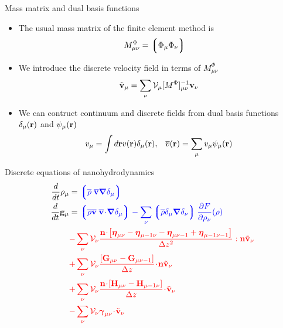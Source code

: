 \documentclass{beamer}
\newcommand{\esc}{\!\cdot\!}
\newcommand{\llg}{\left\lgroup}
\newcommand{\rlg}{\right\rgroup}
\begin{document}
\begin{frame}{Mass matrix and dual basis functions}
  \begin{itemize}
    \item The usual mass matrix of the finite element method is
      \begin{align}
      M^\Phi_{\mu\nu}&=\llg\Phi_\mu\Phi_\nu\rlg  
      \nonumber
      \end{align}
    \item We introduce the discrete velocity field in terms of $M^\Phi_{\mu\nu}$
      \begin{align}
        \tilde{{\bf v}}_{\mu}=\sum_{\nu}{\cal V}_{\mu}[M^{\Phi}]^{-1}_{\mu\nu}{\bf v}_{\nu}
        \nonumber
      \end{align}
  \item We can contruct continuum and discrete fields from dual basis functions $\delta_{\mu}({\bf r})$ and $\psi_\mu({\bf r})$ 
    \begin{align}
      v_\mu=\int d{\bf r}v({\bf r})\delta_\mu({\bf r}),&&
        \overline{v}({\bf r}) =\sum_{\mu}v_\mu\psi_\mu({\bf r})
    \nonumber
    \end{align}
  \end{itemize}
\end{frame}

\begin{frame}{Discrete equations of nanohydrodynamics}
\begin{align}
  \frac{d}{dt}\rho_\mu&=  {\color{blue} \llg\overline{\rho} \; \overline{\bf v}\boldsymbol{\nabla}\delta_\mu \rlg}
\nonumber\\
\frac{d}{dt}{\bf g}_\mu&=
{\color{blue} \llg\overline{\rho} \overline{\bf v}\;\overline{\bf v}\esc\boldsymbol{\nabla}\delta_{\mu}\rlg
-\sum_\nu\llg\overline{\rho}\delta_{\mu}\boldsymbol{\nabla}\delta_{\nu}\rlg
\frac{\partial  F}{\partial \rho_{\nu}}(\rho)}
\nonumber\\
&{\color{red}-\sum_{\nu}{\cal V}_\nu \frac{{\bf n}\esc\left[\boldsymbol{\eta}_{\mu\nu}-\boldsymbol{\eta}_{\mu-1\nu}-\boldsymbol{\eta}_{\mu\nu-1}+\boldsymbol{\eta}_{\mu-1\nu-1}\right]}{\Delta z^2}:{\bf n}\tilde{\bf v}_\nu}
\nonumber\\
&{\color{red}+\sum_{\nu}{\cal V}_\nu\frac{\left[{\bf G}_{\mu\nu}-{\bf G}_{\mu\nu-1}\right]}{\Delta z}\esc{\bf n}\tilde{\bf v}_\nu}
\nonumber\\
&{\color{red}+\sum_{\nu}{\cal V}_\nu\frac{{\bf n}\esc\left[{\bf H}_{\mu\nu}-{\bf H}_{\mu-1\nu}\right]}{\Delta z}\esc\tilde{\bf v}_\nu}
\nonumber\\
&{\color{red}-\sum_{\nu}{\cal V}_\nu\boldsymbol{\gamma}_{\mu\nu}\esc\tilde{\bf v}_\nu}
\nonumber
\end{align}
\end{frame}
\end{document}
